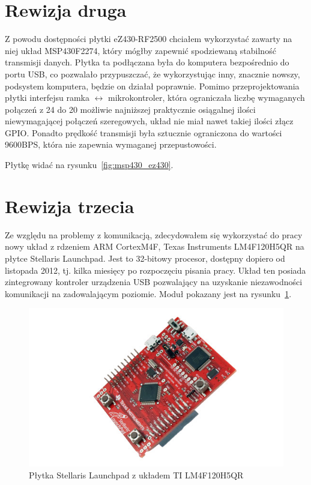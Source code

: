 \section{Rewizja druga}

Z powodu dostępności płytki eZ430-RF2500 chciałem wykorzystać zawarty na niej układ MSP430F2274, który mógłby zapewnić spodziewaną stabilność transmisji danych.
Płytka ta podłączana była do komputera bezpośrednio do portu USB, co pozwalało przypuszczać, że wykorzystując inny, znacznie nowszy, podsystem komputera, będzie on działał poprawnie.
Pomimo przeprojektowania płytki interfejsu ramka $\leftrightarrow$ mikrokontroler, która ograniczała liczbę wymaganych połączeń z 24 do 20 \pauza możliwie najniższej praktycznie osiągalnej ilości niewymagającej połączeń szeregowych, układ nie miał nawet takiej ilości złącz GPIO.
Ponadto prędkość transmisji była sztucznie ograniczona do wartości 9600BPS, która nie zapewnia wymaganej przepustowości.

Płytkę widać na rysunku~\ref{fig:msp430_ez430}.\\

\section{Rewizja trzecia}

Ze względu na problemy z komunikacją, zdecydowałem się wykorzystać do pracy nowy układ z rdzeniem ARM Cortex\ppauza{}M4F, Texas Instruments LM4F120H5QR na płytce Stellaris Launchpad. Jest to 32-bitowy procesor, dostępny dopiero od listopada 2012, tj. kilka miesięcy po rozpoczęciu pisania pracy.
Układ ten posiada zintegrowany kontroler urządzenia USB pozwalający na uzyskanie niezawodności komunikacji na zadowalającym poziomie.
Moduł pokazany jest na rysunku~\ref{fig:stellaris_launchpad}.

\begin{figure}
 \centering
 \includegraphics[width=\textwidth]{gfx/stellaris_launchpad}
 \caption[Płytka Stellaris Launchpad]{Płytka Stellaris Launchpad z układem TI LM4F120H5QR}
 \label{fig:stellaris_launchpad}
\end{figure}

